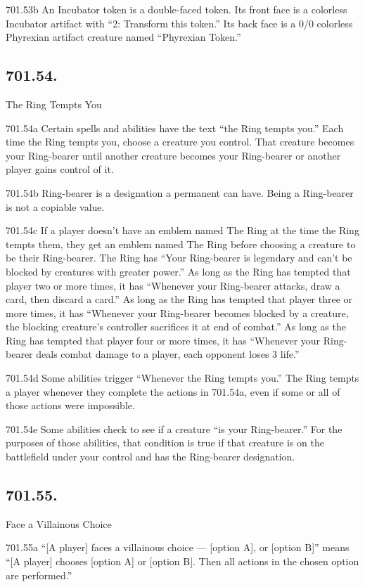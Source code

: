 701.53b An Incubator token is a double-faced token. Its front face is a colorless Incubator artifact with “{2}: Transform this token.” Its back face is a 0/0 colorless Phyrexian artifact creature named “Phyrexian Token.”

\subsection*{701.54.}
The Ring Tempts You

701.54a Certain spells and abilities have the text “the Ring tempts you.” Each time the Ring tempts you, choose a creature you control. That creature becomes your Ring-bearer until another creature becomes your Ring-bearer or another player gains control of it.

701.54b Ring-bearer is a designation a permanent can have. Being a Ring-bearer is not a copiable value.

701.54c If a player doesn’t have an emblem named The Ring at the time the Ring tempts them, they get an emblem named The Ring before choosing a creature to be their Ring-bearer. The Ring has “Your Ring-bearer is legendary and can’t be blocked by creatures with greater power.” As long as the Ring has tempted that player two or more times, it has “Whenever your Ring-bearer attacks, draw a card, then discard a card.” As long as the Ring has tempted that player three or more times, it has “Whenever your Ring-bearer becomes blocked by a creature, the blocking creature’s controller sacrifices it at end of combat.” As long as the Ring has tempted that player four or more times, it has “Whenever your Ring-bearer deals combat damage to a player, each opponent loses 3 life.”

701.54d Some abilities trigger “Whenever the Ring tempts you.” The Ring tempts a player whenever they complete the actions in 701.54a, even if some or all of those actions were impossible.

701.54e Some abilities check to see if a creature “is your Ring-bearer.” For the purposes of those abilities, that condition is true if that creature is on the battlefield under your control and has the Ring-bearer designation.

\subsection*{701.55.}
Face a Villainous Choice

701.55a “[A player] faces a villainous choice — [option A], or [option B]” means “[A player] chooses [option A] or [option B]. Then all actions in the chosen option are performed.”

